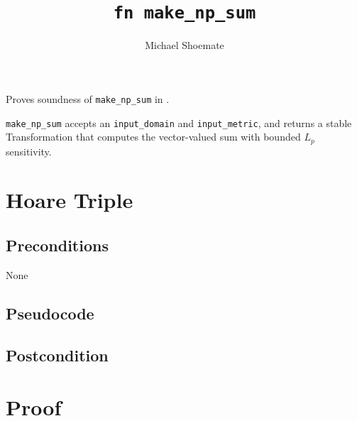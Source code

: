 \documentclass{article}
\title{\texttt{fn make\_np\_sum}}
\author{Michael Shoemate}
\begin{document}
\maketitle

\floatingPoint
\contrib

Proves soundness of \texttt{make\_np\_sum} in .

\texttt{make\_np\_sum} accepts an \texttt{input\_domain} and \texttt{input\_metric},
and returns a stable Transformation that computes the vector-valued sum with bounded $L_p$ sensitivity.

\section{Hoare Triple}

\subsection*{Preconditions}
None

\subsection*{Pseudocode}


\subsection*{Postcondition}


\section{Proof}
\end{document}
